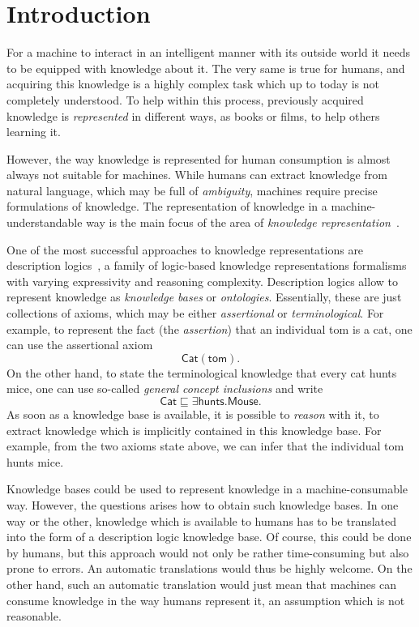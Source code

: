 \chapter{Introduction}
\label{cha:introduction}

For a machine to interact in an intelligent manner with its outside world it needs to be
equipped with knowledge about it.  The very same is true for humans, and acquiring this
knowledge is a highly complex task which up to today is not completely understood.  To
help within this process, previously acquired knowledge is \emph{represented} in different
ways, \eg as books or films, to help others learning it.

However, the way knowledge is represented for human consumption is almost always not
suitable for machines.  While humans can extract knowledge from natural language, which
may be full of \emph{ambiguity}, machines require precise formulations of knowledge.  The
representation of knowledge in a machine-understandable way is the main focus of the area
of \emph{knowledge representation}~\cite{KRhandbook}.

One of the most successful approaches to knowledge representations are description
logics~\cite{DLhandbook}, a family of logic-based knowledge representations formalisms
with varying expressivity and reasoning complexity.  Description logics allow to represent
knowledge as \emph{knowledge bases} or \emph{ontologies}.  Essentially, these are just
collections of axioms, which may be either \emph{assertional} or \emph{terminological}.
For example, to represent the fact (the \emph{assertion}) that an individual \textsf{tom}
is a cat, one can use the assertional axiom
\begin{equation}
  \label{eq:14}
  \mathsf{Cat}(\mathsf{tom}).
\end{equation}
On the other hand, to state the terminological knowledge that every cat hunts mice, one
can use so-called \emph{general concept inclusions} and write
\begin{equation}
  \label{eq:15}
  \mathsf{Cat} \sqsubseteq \exists \mathsf{hunts}. \mathsf{Mouse}.
\end{equation}
As soon as a knowledge base is available, it is possible to \emph{reason} with it, \ie to
extract knowledge which is implicitly contained in this knowledge base.  For example, from
the two axioms state above, we can infer that the individual \textsf{tom} hunts mice.

Knowledge bases could be used to represent knowledge in a machine-consumable way.
However, the questions arises how to obtain such knowledge bases.  In one way or the
other, knowledge which is available to humans has to be translated into the form of a
description logic knowledge base.  Of course, this could be done by humans, but this
approach would not only be rather time-consuming but also prone to errors.  An automatic
translations would thus be highly welcome.  On the other hand, such an automatic
translation would just mean that machines can consume knowledge in the way humans
represent it, an assumption which is not reasonable.

